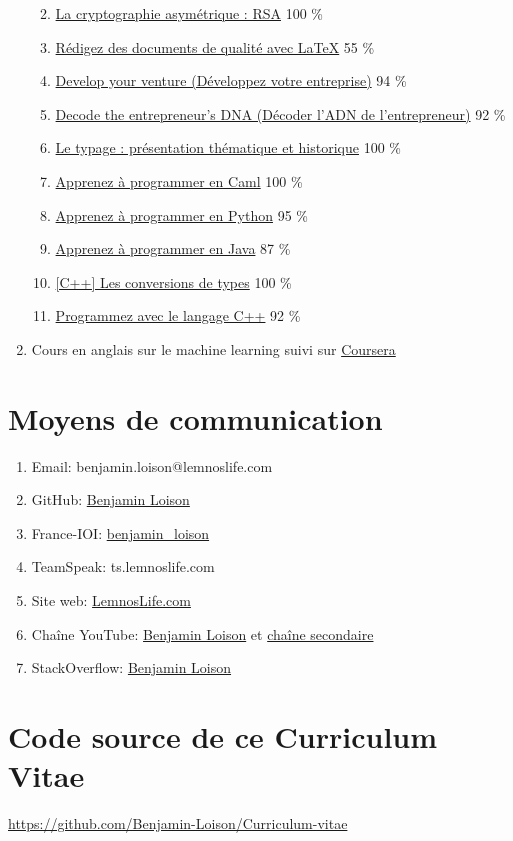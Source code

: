 \documentclass{article}
\newcommand{\lesson}[3]
{
	\item \href{https://openclassrooms.com/courses/#1}{#2} #3 \%
}
\begin{document}
\begin{enumerate}
		\begin{enumerate}

			\lesson{1362801}{La cryptographie asymétrique : RSA}{100}
			\lesson{1617396}{Rédigez des documents de qualité avec LaTeX}{55}
			\lesson{2976551}{Develop your venture (Développez votre entreprise)}{94}
			\lesson{2709621}{Decode the entrepreneur's DNA (Décoder l'ADN de l'entrepreneur)}{92}
			\lesson{1129721}{Le typage : présentation thématique et historique}{100}
			\lesson{1818146}{Apprenez à programmer en Caml}{100}
			\lesson{235344}{Apprenez à programmer en Python}{95}
			\lesson{26832}{Apprenez à programmer en Java}{87}
			\lesson{1170641}{[C++] Les conversions de types}{100}
			\lesson{1894236}{Programmez avec le langage C++}{92}
						 
		\end{enumerate}
		
		\item Cours en anglais sur le machine learning suivi sur \href{https://www.coursera.org/learn/machine-learning?}{Coursera}

	\end{enumerate}

	\section{Moyens de communication}

		\begin{enumerate}

			\item Email: benjamin.loison@lemnoslife.com
			\item GitHub: \href{https://github.com/Benjamin-Loison}{Benjamin Loison}
			\item France-IOI: \href{http://france-ioi.org/user/perso.php?sLogin=benjamin_loison}{benjamin\_loison}
			\item TeamSpeak: ts.lemnoslife.com
			\item Site web: \href{https://lemnoslife.com}{LemnosLife.com}
			\item Chaîne YouTube: \href{https://youtube.com/c/BenjaminLoison}{Benjamin Loison} et \href{https://www.youtube.com/channel/UCt5USYpzzMCYhkirVQGHwKQ}{chaîne secondaire}
			\item StackOverflow: \href{https://stackoverflow.com/users/7123660/benjamin-loison}{Benjamin Loison}

		\end{enumerate}
		
	\section{Code source de ce Curriculum Vitae}
	
		\url{https://github.com/Benjamin-Loison/Curriculum-vitae}
\end{document}

